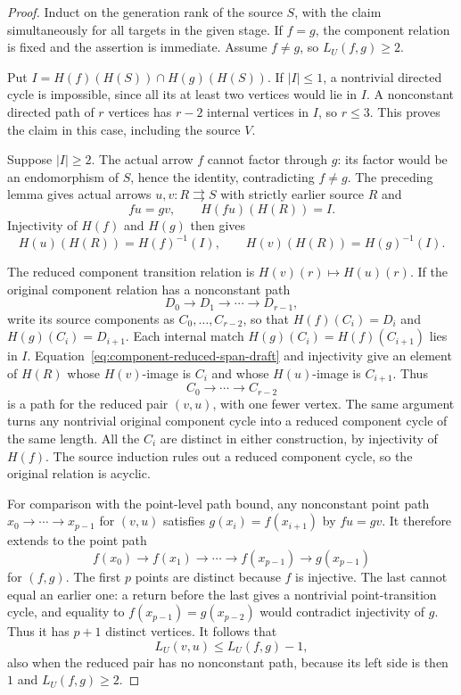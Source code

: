 \begin{proof}
Induct on the generation rank of the source $S$, with the claim
simultaneously for all targets in the given stage. If $f=g$,
the component relation is fixed and the assertion is immediate.
Assume $f\ne g$, so $L_U(f,g)\geq2$.

Put $I=H(f)(H(S))\cap H(g)(H(S))$. If $|I|\leq1$, a
nontrivial directed cycle is impossible, since all its at least
two vertices would lie in $I$. A nonconstant directed path of
$r$ vertices has $r-2$ internal vertices in $I$, so $r\leq3$.
This proves the claim in this case, including the source $V$.

Suppose $|I|\geq2$. The actual arrow $f$ cannot factor through
$g$: its factor would be an endomorphism of $S$, hence the
identity, contradicting $f\ne g$. The preceding lemma gives
actual arrows $u,v:R\rightrightarrows S$ with strictly earlier
source $R$ and
\[
                    fu=gv,\qquad H(fu)(H(R))=I.
 \tag{RS}\label{eq:component-reduced-span-draft}
\]
Injectivity of $H(f)$ and $H(g)$ then gives
\[
 H(u)(H(R))=H(f)^{-1}(I),\qquad
 H(v)(H(R))=H(g)^{-1}(I).
\]

The reduced component transition relation is
$H(v)(r)\mapsto H(u)(r)$. If the original component relation
has a nonconstant path
\[
                   D_0\longrightarrow D_1\longrightarrow
                          \cdots\longrightarrow D_{r-1},
\]
write its source components as $C_0,\ldots,C_{r-2}$, so that
$H(f)(C_i)=D_i$ and $H(g)(C_i)=D_{i+1}$. Each internal match
$H(g)(C_i)=H(f)(C_{i+1})$ lies in $I$.
Equation~\eqref{eq:component-reduced-span-draft} and injectivity
give an element of $H(R)$ whose $H(v)$-image is $C_i$ and whose
$H(u)$-image is $C_{i+1}$. Thus
\[
                      C_0\longrightarrow\cdots
                           \longrightarrow C_{r-2}
\]
is a path for the reduced pair $(v,u)$, with one fewer vertex.
The same argument turns any nontrivial original component cycle
into a reduced component cycle of the same length. All the
$C_i$ are distinct in either construction, by injectivity of
$H(f)$. The source induction rules out a reduced component cycle,
so the original relation is acyclic.

For comparison with the point-level path bound, any nonconstant
point path $x_0\to\cdots\to x_{p-1}$ for $(v,u)$ satisfies
$g(x_i)=f(x_{i+1})$ by $fu=gv$. It therefore extends to the
point path
\[
       f(x_0)\longrightarrow f(x_1)\longrightarrow\cdots
       \longrightarrow f(x_{p-1})\longrightarrow g(x_{p-1})
\]
for $(f,g)$. The first $p$ points are distinct because $f$ is
injective. The last cannot equal an earlier one: a return before
the last gives a nontrivial point-transition cycle, and equality
to $f(x_{p-1})=g(x_{p-2})$ would contradict injectivity of $g$.
Thus it has $p+1$ distinct vertices. It follows that
\[
                    L_U(v,u)\leq L_U(f,g)-1,
\]
also when the reduced pair has no nonconstant path, because its
left side is then $1$ and $L_U(f,g)\geq2$.


\end{proof}
